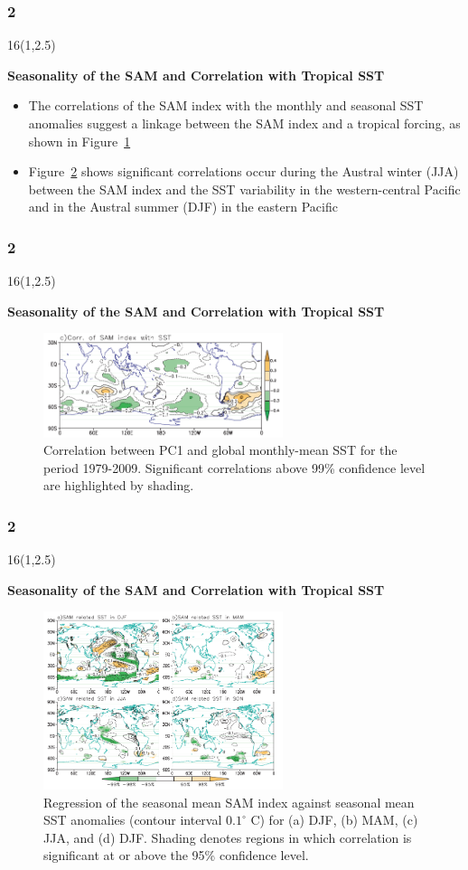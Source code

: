\documentclass{beamer}
\newcommand\FrameText[1]{
\begin{textblock}{16}(1,2.5)
\raggedright #1
\end{textblock}}
\begin{document}
\begin{frame}
\frametitle{2}
\FrameText{\bf{\large Seasonality of the SAM and Correlation with Tropical SST}}
\begin{itemize}
\item The correlations of the SAM index with the monthly and seasonal SST anomalies suggest a linkage between the SAM index and a tropical forcing, as shown in Figure~\ref{4} 
\item Figure~\ref{5} shows significant correlations occur during the Austral winter (JJA) between the SAM index and the SST variability in the western-central Pacific and in the Austral summer (DJF) in the eastern Pacific
\end{itemize}
\end{frame}

\begin{frame}
\frametitle{2}
\FrameText{\bf{\large Seasonality of the SAM and Correlation
with Tropical SST}}
\begin{figure}
\centering
\includegraphics[width=7cm]{4.png}
\caption{\tiny Correlation between PC1 and global monthly-mean SST for the period 1979-2009.
Significant correlations above 99\% confidence level are highlighted by shading.}
\label{4}
\end{figure}
\end{frame}

\begin{frame}
\frametitle{2}
\FrameText{\bf{\large Seasonality of the SAM and Correlation
with Tropical SST}}
\begin{figure}
\centering
\includegraphics[width=7cm]{5.png}
\caption{\tiny Regression of the seasonal mean SAM index against
  seasonal mean SST anomalies (contour interval $0.1^{\circ}$ C)
for (a) DJF, (b) MAM, (c) JJA, and (d) DJF. Shading denotes regions in which correlation is significant at or above
the 95\% confidence level.}
\label{5}
\end{figure}
\end{frame}
\end{document}
